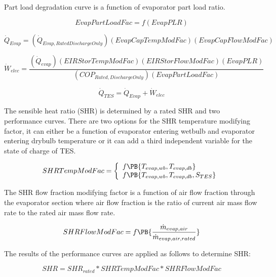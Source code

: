 Part load degradation curve is a function of evaporator part load ratio.

\begin{equation}
EvapPartLoadFac = f\left( {EvapPLR} \right)
\end{equation}

\begin{equation}
{\dot Q_{Evap}} = \left( {{{\dot Q}_{Evap,RatedDischargeOnly}}} \right)\left( {EvapCapTempModFac} \right)\left( {EvapCapFlowModFac} \right)
\end{equation}

\begin{equation}
{\dot W_{elec}} = \frac{{\left( {{{\dot Q}_{evap}}} \right)\left( {EIRStorTempModFac} \right)\left( {EIRStorFlowModFac} \right)\left( {EvapPLR} \right)}}{{\left( {CO{P_{Rated,DischargeOnly}}} \right)\left( {EvapPartLoadFac} \right)}}
\end{equation}

\begin{equation}
{\dot Q_{TES}} = {\dot Q_{Evap}} + {\dot W_{elec}}
\end{equation}

The sensible heat ratio (SHR) is determined by a rated SHR and two performance curves. There are two options for the SHR temperature modifying factor, it can either be a function of evaporator entering wetbulb and evaporator entering drybulb temperature or it can add a third independent variable for the state of charge of TES.

\begin{equation}
  SHRTempModFac = \left\{
    \begin{array}{l}
      f\PB{T_{evap,wb},T_{evap,db}} \\
      f\PB{T_{evap,wb},T_{evap,db},S_{TES}}
    \end{array}
  \right.
\end{equation}

The SHR flow fraction modifying factor is a function of air flow fraction through the evaporator section where air flow fraction is the ratio of current air mass flow rate to the rated air mass flow rate.

\begin{equation}
SHRFlowModFac = f\PB{\frac{\dot{m}_{evap,air}}{\dot{m}_{evap,air,rated}}}
\end{equation}

The results of the performance curves are applied as follows to determine SHR:

\begin{equation}
SHR = SH{R_{rated}}*SHRTempModFac*SHRFlowModFac
\end{equation}

